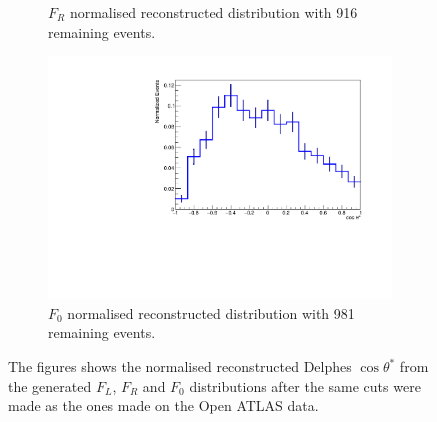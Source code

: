 \documentclass[12pt,a4paper]{article}
\numberwithin{equation}{section}
\begin{document}
\begin{figure}[t!]
\begin{subfigure}[t]{0.47\textwidth}
    \caption{$F_R$ normalised reconstructed distribution with 916 remaining events.}
  \end{subfigure}
  \begin{subfigure}[t]{0.5\textwidth}
    \centering
    \includegraphics[width=1.1\textwidth]{figures/delphes_ctstar0}
    \caption{$F_0$ normalised reconstructed distribution with 981 remaining events.}
  \end{subfigure}
  \caption{The figures shows the normalised reconstructed Delphes $\cos \theta^*$ from the
    generated $F_L$, $F_R$ and $F_0$ distributions after the same cuts were made
    as the ones made on the Open ATLAS data.}\label{fig:redelphesdist}
\end{figure}
\end{document}

